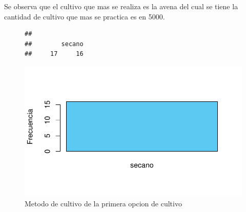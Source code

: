 \documentclass[12pt]{article}\usepackage[]{graphicx}\usepackage[]{xcolor}
\makeatletter
\def\maxwidth{ %
  \ifdim\Gin@nat@width>\linewidth
    \linewidth
  \else
    \Gin@nat@width
  \fi
}
\newenvironment{kframe}{%
 \def\at@end@of@kframe{}%
 \ifinner\ifhmode%
  \def\at@end@of@kframe{\end{minipage}}%
  \begin{minipage}{\columnwidth}%
 \fi\fi%
 \def\FrameCommand##1{\hskip\@totalleftmargin \hskip-\fboxsep
 \colorbox{shadecolor}{##1}\hskip-\fboxsep
     \hskip-\linewidth \hskip-\@totalleftmargin \hskip\columnwidth}%
 \MakeFramed {\advance\hsize-\width
   \@totalleftmargin\z@ \linewidth\hsize
   \@setminipage}}%
 {\par\unskip\endMakeFramed%
 \at@end@of@kframe}
\newenvironment{knitrout}{}{} %
\makeatother
\begin{document}
	Se observa que el cultivo que mas se realiza es la avena del cual se tiene la cantidad de cultivo que mas se practica es en 5000.
	\begin{figure}[H]
	\centering
\begin{knitrout}
\color{fgcolor}\begin{kframe}
\begin{verbatim}
## 
##        secano 
##     17     16
\end{verbatim}
\end{kframe}
\includegraphics[width=\maxwidth]{figure/twelve-1} 
\end{knitrout}
	\caption{Metodo de cultivo de la primera opcion de cultivo}
	\end{figure}
	
\end{document}
